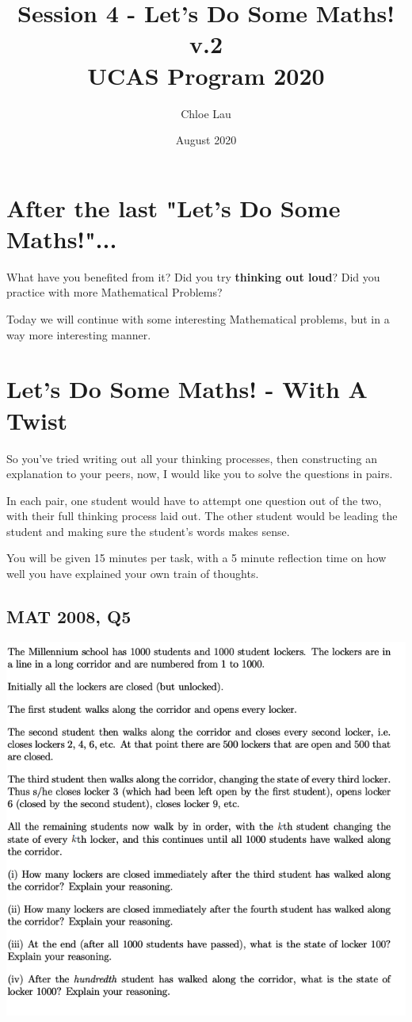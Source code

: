 \documentclass[12pt]{article}
\title{\vspace{-2cm} \textbf{Session 4 - Let's Do Some Maths! v.2} \\ UCAS Program 2020}
\author{Chloe Lau}
\date{August 2020}
\begin{document}
\setlength{\parindent}{4ex}
\setlength{\parskip}{1em}

\maketitle

\section{After the last "Let's Do Some Maths!"...}
What have you benefited from it? Did you try \textbf{thinking out loud}? Did you practice with more Mathematical Problems?

Today we will continue with some interesting Mathematical problems, but in a way more interesting manner.

\section{Let's Do Some Maths! - With A Twist}
So you've tried writing out all your thinking processes, then constructing an explanation to your peers, now, I would like you to solve the questions in pairs.

In each pair, one student would have to attempt one question out of the two, with their full thinking process laid out. The other student would be leading the student and making sure the student's words makes sense.

You will be given 15 minutes per task, with a 5 minute reflection time on how well you have explained your own train of thoughts.


\newpage
\subsection{MAT 2008, Q5}
\begin{center}
    \includegraphics[scale=0.55]{mat08-5.png}
\end{center}
\end{document}
